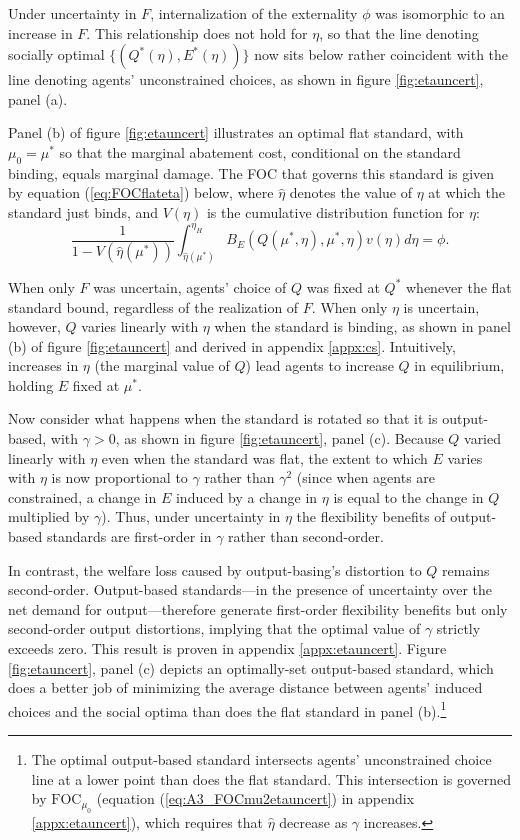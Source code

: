 \documentclass[12pt]{article}
\begin{document}
Under uncertainty in $F$, internalization of the externality $\phi$ was isomorphic to an increase in $F$. This relationship does not hold for $\eta$, so that the line denoting socially optimal $\{(Q^*(\eta),E^*(\eta))\}$ now sits below rather coincident with the line denoting agents' unconstrained choices, as shown in figure \ref{fig:etauncert}, panel (a).

Panel (b) of figure \ref{fig:etauncert} illustrates an optimal flat standard, with $\mu_0=\mu^*$ so that the marginal abatement cost, conditional on the standard binding, equals marginal damage. The FOC that governs this standard is given by equation (\ref{eq:FOCflateta}) below, where $\hat{\eta}$ denotes the value of $\eta$ at which the standard just binds, and $V(\eta)$ is the cumulative distribution function for $\eta$:
\begin{equation}
\frac{1}{1-V(\hat{\eta}(\mu^*))}\int_{\hat{\eta}(\mu^*)}^{\eta_H}B_E(Q(\mu^*,\eta),\mu^*,\eta)v(\eta)d\eta=\phi. \label{eq:FOCflateta}
\end{equation}

When only $F$ was uncertain, agents' choice of $Q$ was fixed at $Q^*$ whenever the flat standard bound, regardless of the realization of $F$. When only $\eta$ is uncertain, however, $Q$ varies linearly with $\eta$ when the standard is binding, as shown in panel (b) of figure \ref{fig:etauncert} and derived in appendix \ref{appx:cs}. Intuitively, increases in $\eta$ (the marginal value of $Q$) lead agents to increase $Q$ in equilibrium, holding $E$ fixed at $\mu^*$. 

Now consider what happens when the standard is rotated so that it is output-based, with $\gamma>0$, as shown in figure \ref{fig:etauncert}, panel (c). Because $Q$ varied linearly with $\eta$ even when the standard was flat, the extent to which $E$ varies with $\eta$ is now proportional to $\gamma$ rather than $\gamma^2$ (since when agents are constrained, a change in $E$ induced by a change in $\eta$ is equal to the change in $Q$ multiplied by $\gamma$). Thus, under uncertainty in $\eta$ the flexibility benefits of output-based standards are first-order in $\gamma$ rather than second-order. 

In contrast, the welfare loss caused by output-basing's distortion to $Q$ remains second-order. Output-based standards---in the presence of uncertainty over the net demand for output---therefore generate first-order flexibility benefits but only second-order output distortions, implying that the optimal value of $\gamma$ strictly exceeds zero. This result is proven in appendix \ref{appx:etauncert}. Figure \ref{fig:etauncert}, panel (c) depicts an optimally-set output-based standard, which does a better job of minimizing the average distance between agents' induced choices and the social optima than does the flat standard in panel (b).\footnote{The optimal output-based standard intersects agents' unconstrained choice line at a lower point than does the flat standard. This intersection is governed by $\text{FOC}_{\mu_0}$ (equation (\ref{eq:A3_FOCmu2etauncert}) in appendix \ref{appx:etauncert}), which requires that $\hat{\eta}$ decrease as $\gamma$ increases.}
\end{document}
